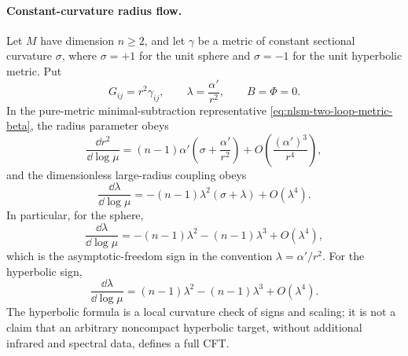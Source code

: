 \paragraph{Constant-curvature radius flow.}
Let \(M\) have dimension \(n\ge2\), and let \(\gamma\) be a metric of
constant sectional curvature \(\sigma\), where
\(\sigma=+1\) for the unit sphere and \(\sigma=-1\) for the unit hyperbolic
metric.  Put
\begin{equation}
  G_{ij}=r^2\gamma_{ij},
  \qquad
  \lambda=\frac{\alpha'}{r^2},
  \qquad
  B=\Phi=0 .
  \label{eq:nlsm-constant-curvature-ansatz}
\end{equation}
In the pure-metric minimal-subtraction representative
\eqref{eq:nlsm-two-loop-metric-beta}, the radius parameter obeys
\begin{equation}
  \frac{\dd r^2}{\dd\log\mu}
  =
  (n-1)\alpha'
  \left(
    \sigma+\frac{\alpha'}{r^2}
  \right)
  +
  O\!\left(\frac{(\alpha')^3}{r^4}\right),
  \label{eq:nlsm-radius-squared-beta}
\end{equation}
and the dimensionless large-radius coupling obeys
\begin{equation}
  \frac{\dd\lambda}{\dd\log\mu}
  =
  -(n-1)\lambda^2(\sigma+\lambda)+O(\lambda^4).
  \label{eq:nlsm-constant-curvature-lambda-beta}
\end{equation}
In particular, for the sphere,
\begin{equation}
  \frac{\dd\lambda}{\dd\log\mu}
  =
  -(n-1)\lambda^2-(n-1)\lambda^3+O(\lambda^4),
  \label{eq:nlsm-sphere-coupling-beta}
\end{equation}
which is the asymptotic-freedom sign in the convention
\(\lambda=\alpha'/r^2\).  For the hyperbolic sign,
\begin{equation}
  \frac{\dd\lambda}{\dd\log\mu}
  =
  (n-1)\lambda^2-(n-1)\lambda^3+O(\lambda^4).
  \label{eq:nlsm-hyperbolic-coupling-beta}
\end{equation}
The hyperbolic formula is a local curvature check of signs and scaling; it
is not a claim that an arbitrary noncompact hyperbolic target, without
additional infrared and spectral data, defines a full CFT.

